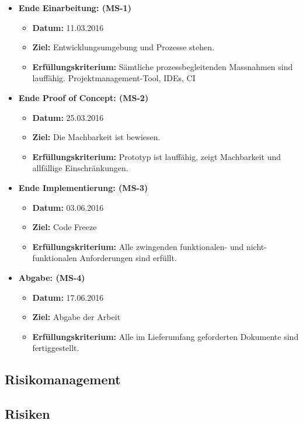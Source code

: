\begin{itemize}
	\item{\textbf{Ende Einarbeitung: (MS-1)} 
		\begin{itemize}
			\item{\textbf{Datum:} 11.03.2016}
			\item{\textbf{Ziel:} Entwicklungsumgebung und Prozesse stehen.}
			\item{\textbf{Erfüllungskriterium:} Sämtliche prozessbegleitenden Massnahmen sind lauffähig. Projektmanagement-Tool, IDEs, CI}
		\end{itemize}
	}
	
	\item{\textbf{Ende Proof of Concept: (MS-2)} 
		\begin{itemize}
			\item{\textbf{Datum:} 25.03.2016}
			\item{\textbf{Ziel:} Die Machbarkeit ist bewiesen.}
			\item{\textbf{Erfüllungskriterium:} Prototyp ist lauffähig, zeigt Machbarkeit und allfällige Einschränkungen.}
		\end{itemize}
	}
	
	\item{\textbf{Ende Implementierung: (MS-3)} 
		\begin{itemize}
			\item{\textbf{Datum:} 03.06.2016}
			\item{\textbf{Ziel:} Code Freeze}
			\item{\textbf{Erfüllungskriterium:} Alle zwingenden funktionalen- und nicht-funktionalen Anforderungen sind erfüllt.}
		\end{itemize}
	}	
	\item{\textbf{Abgabe: (MS-4)} 
			\begin{itemize}
				\item{\textbf{Datum:} 17.06.2016}
				\item{\textbf{Ziel:} Abgabe der Arbeit}
				\item{\textbf{Erfüllungskriterium:} Alle im Lieferumfang geforderten Dokumente sind fertiggestellt.}
			\end{itemize}
	}
	
\end{itemize}

\newpage


\begin{landscape}
\section{Risikomanagement}
\subsection{Risiken}
\end{landscape}
